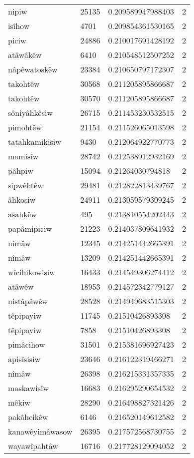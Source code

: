 \begin{longtable}{llll}
nipiw & 25135 & 0.209589947988403 & 2 \\
isîhow & 4701 & 0.209854361530165 & 2 \\
piciw & 24886 & 0.210017691428192 & 2 \\
atâwâkêw & 6410 & 0.210548512507252 & 2 \\
nâpêwatoskêw & 23384 & 0.210650797172307 & 2 \\
takohtêw & 30568 & 0.211205895866687 & 2 \\
takohtêw & 30570 & 0.211205895866687 & 2 \\
sôniyâhkêsiw & 26715 & 0.211453230532515 & 2 \\
pimohtêw & 21154 & 0.211526065013598 & 2 \\
tatahkamikisiw & 9430 & 0.212064922770773 & 2 \\
mamisîw & 28742 & 0.212538912932169 & 2 \\
pâhpiw & 15094 & 0.21264030794818 & 2 \\
sipwêhtêw & 29481 & 0.212822813439767 & 2 \\
âhkosiw & 24911 & 0.213059579309245 & 2 \\
asahkêw & 495 & 0.213810554202443 & 2 \\
papâmipiciw & 21223 & 0.214037809641932 & 2 \\
nîmâw & 12345 & 0.214251442665391 & 2 \\
nîmâw & 13209 & 0.214251442665391 & 2 \\
wîcihikowisiw & 16433 & 0.214549306274412 & 2 \\
atâwêw & 18953 & 0.214572342779127 & 2 \\
nistâpâwêw & 28528 & 0.214949683515303 & 2 \\
têpipayiw & 11745 & 0.21510426893308 & 2 \\
têpipayiw & 7858 & 0.21510426893308 & 2 \\
pimâcihow & 31501 & 0.215381696927423 & 2 \\
apisîsisiw & 23646 & 0.216122319466271 & 2 \\
nîmâw & 26398 & 0.216215331357335 & 2 \\
maskawisîw & 16683 & 0.216295290654532 & 2 \\
mêkiw & 28290 & 0.216498827321426 & 2 \\
pakâhcikêw & 6146 & 0.216520149612582 & 2 \\
kanawêyimâwasow & 26395 & 0.217572568730755 & 2 \\
wayawîpahtâw & 16716 & 0.217728129094052 & 2 \\

\end{longtable}
